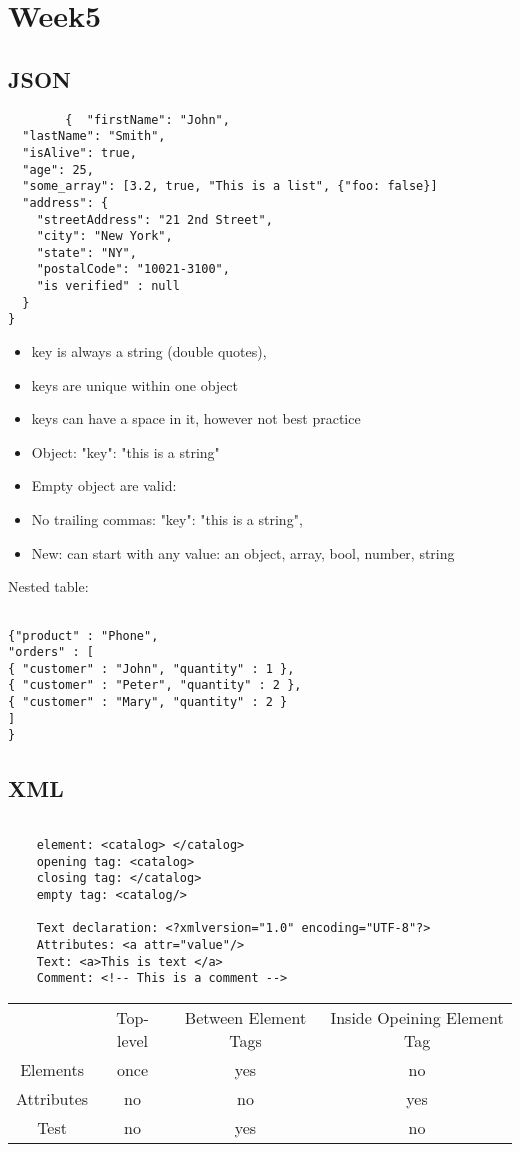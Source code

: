 

\section{Week5}
\subsection{JSON}

    \begin{lstlisting}
        {  "firstName": "John",
  "lastName": "Smith",
  "isAlive": true,
  "age": 25,
  "some_array": [3.2, true, "This is a list", {"foo: false}]
  "address": {
    "streetAddress": "21 2nd Street",
    "city": "New York",
    "state": "NY",
    "postalCode": "10021-3100",
    "is verified" : null
  }
}
    \end{lstlisting}

\begin{itemize}
    \item key is always a string (double quotes),
    \item keys are unique within one object
    \item keys can have a space in it, however not best practice
    \item Object: {"key": "this is a string"}
    \item Empty object are valid: {}
    \item No trailing commas: {"key": "this is a string",}
    \item New: can start with any value: an object, array, bool, number, string
\end{itemize}

Nested table:\\
    \begin{lstlisting}

{"product" : "Phone",
"orders" : [
{ "customer" : "John", "quantity" : 1 },
{ "customer" : "Peter", "quantity" : 2 },
{ "customer" : "Mary", "quantity" : 2 }
]
}
\end{lstlisting}

\subsection{XML}

    \begin{lstlisting}

    element: <catalog> </catalog>
    opening tag: <catalog>
    closing tag: </catalog>
    empty tag: <catalog/>

    Text declaration: <?xmlversion="1.0" encoding="UTF-8"?>
    Attributes: <a attr="value"/>
    Text: <a>This is text </a>
    Comment: <!-- This is a comment -->
    \end{lstlisting}

    \begin{tabular}{ c c c c}
    & Top-level & Between Element Tags & Inside Opeining Element Tag \\
Elements& once & yes& no \\
Attributes & no & no & yes \\
Test & no & yes & no\\
\end{tabular}




    


